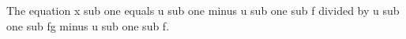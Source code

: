 The equation x sub one equals u sub one minus u sub one sub f divided by u sub one sub fg minus u sub one sub f.